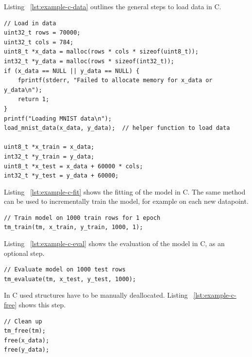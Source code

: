Listing ~\ref{lst:example-c-data} outlines the general steps to load data in C.

\begin{listing}[!htbp]
    \caption{Example C data loading\label{lst:example-c-data}}
    \begin{verbatim}
// Load in data
uint32_t rows = 70000;
uint32_t cols = 784;
uint8_t *x_data = malloc(rows * cols * sizeof(uint8_t));
int32_t *y_data = malloc(rows * sizeof(int32_t));
if (x_data == NULL || y_data == NULL) {
    fprintf(stderr, "Failed to allocate memory for x_data or y_data\n");
    return 1;
}
printf("Loading MNIST data\n");
load_mnist_data(x_data, y_data);  // helper function to load data

uint8_t *x_train = x_data;
int32_t *y_train = y_data;
uint8_t *x_test = x_data + 60000 * cols;
int32_t *y_test = y_data + 60000;
    \end{verbatim}
\end{listing}
\FloatBarrier

Listing ~\ref{lst:example-c-fit} shows the fitting of the model in C. The same method can be used to incrementally train the model, for example on each new datapoint.

\begin{listing}[!htbp]
    \caption{Example C model fitting\label{lst:example-c-fit}}
    \begin{verbatim}
// Train model on 1000 train rows for 1 epoch
tm_train(tm, x_train, y_train, 1000, 1);
    \end{verbatim}
\end{listing}
\FloatBarrier

Listing ~\ref{lst:example-c-eval} shows the evaluation of the model in C, as an optional step.

\begin{listing}[!htbp]
    \caption{Example C model evaluation\label{lst:example-c-eval}}
    \begin{verbatim}
// Evaluate model on 1000 test rows
tm_evaluate(tm, x_test, y_test, 1000);
    \end{verbatim}
\end{listing}
\FloatBarrier

In C used structures have to be manually deallocated. Listing ~\ref{lst:example-c-free} shows this step.

\begin{listing}[!htbp]
    \caption{Example C deallocation\label{lst:example-c-free}}
    \begin{verbatim}
// Clean up
tm_free(tm);
free(x_data);
free(y_data);
    \end{verbatim}
\end{listing}
\FloatBarrier

